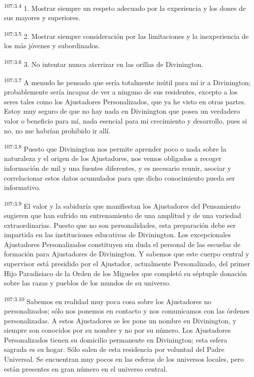 \par
\textsuperscript{107:3.4} 1. Mostrar siempre un respeto adecuado por la experiencia y los dones de sus mayores y superiores.

\par
\textsuperscript{107:3.5} 2. Mostrar siempre consideración por las limitaciones y la inexperiencia de los más jóvenes y subordinados.

\par
\textsuperscript{107:3.6} 3. No intentar nunca aterrizar en las orillas de Divinington.

\par
\textsuperscript{107:3.7} A menudo he pensado que sería totalmente inútil para mí ir a Divinington; probablemente sería incapaz de ver a ninguno de sus residentes, excepto a los seres tales como los Ajustadores Personalizados, que ya he visto en otras partes. Estoy muy seguro de que no hay nada en Divinington que posea un verdadero valor o beneficio para mí, nada esencial para mi crecimiento y desarrollo, pues si no, no me habrían prohibido ir allí.

\par
\textsuperscript{107:3.8} Puesto que Divinington nos permite aprender poco o nada sobre la naturaleza y el origen de los Ajustadores, nos vemos obligados a recoger información de mil y una fuentes diferentes, y es necesario reunir, asociar y correlacionar estos datos acumulados para que dicho conocimiento pueda ser informativo.

\par
\textsuperscript{107:3.9} El valor y la sabiduría que manifiestan los Ajustadores del Pensamiento sugieren que han sufrido un entrenamiento de una amplitud y de una variedad extraordinarias. Puesto que no son personalidades, esta preparación debe ser impartida en las instituciones educativas de Divinington. Los excepcionales Ajustadores Personalizados constituyen sin duda el personal de las escuelas de formación para Ajustadores de Divinington. Y sabemos que este cuerpo central y supervisor está presidido por el Ajustador, actualmente Personalizado, del primer Hijo Paradisiaco de la Orden de los Migueles que completó su séptuple donación sobre las razas y pueblos de los mundos de su universo.

\par
\textsuperscript{107:3.10} Sabemos en realidad muy poca cosa sobre los Ajustadores no personalizados; sólo nos ponemos en contacto y nos comunicamos con las órdenes personalizadas. A estos Ajustadores se les pone un nombre en Divinington, y siempre son conocidos por su nombre y no por su número. Los Ajustadores Personalizados tienen su domicilio permanente en Divinington; esta esfera sagrada es su hogar. Sólo salen de esta residencia por voluntad del Padre Universal. Se encuentran muy pocos en las esferas de los universos locales, pero están presentes en gran número en el universo central.


